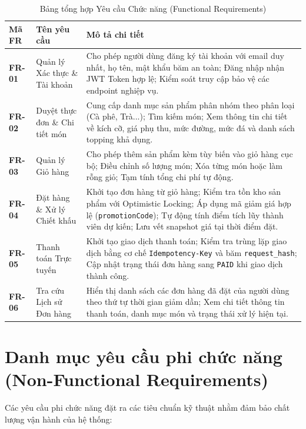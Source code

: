 \documentclass[12pt,a4paper,oneside]{report}
\begin{document}
\begin{table}[H]
\centering
\caption{Bảng tổng hợp Yêu cầu Chức năng (Functional Requirements)}
\label{tab:functional-requirements}
\begin{tabularx}{\textwidth}{lp{3.5cm}X}
\toprule
\textbf{Mã FR} & \textbf{Tên yêu cầu} & \textbf{Mô tả chi tiết} \\
\midrule
\textbf{FR-01} & Quản lý Xác thực \& Tài khoản & Cho phép người dùng đăng ký tài khoản với email duy nhất, họ tên, mật khẩu băm an toàn; Đăng nhập nhận JWT Token hợp lệ; Kiểm soát truy cập bảo vệ các endpoint nghiệp vụ. \\
\textbf{FR-02} & Duyệt thực đơn \& Chi tiết món & Cung cấp danh mục sản phẩm phân nhóm theo phân loại (Cà phê, Trà...); Tìm kiếm món; Xem thông tin chi tiết về kích cỡ, giá phụ thu, mức đường, mức đá và danh sách topping khả dụng. \\
\textbf{FR-03} & Quản lý Giỏ hàng & Cho phép thêm sản phẩm kèm tùy biến vào giỏ hàng cục bộ; Điều chỉnh số lượng món; Xóa từng món hoặc làm rỗng giỏ; Tạm tính tổng chi phí tự động. \\
\textbf{FR-04} & Đặt hàng \& Xử lý Chiết khấu & Khởi tạo đơn hàng từ giỏ hàng; Kiểm tra tồn kho sản phẩm với Optimistic Locking; Áp dụng mã giảm giá hợp lệ (\texttt{promotionCode}); Tự động tính điểm tích lũy thành viên dự kiến; Lưu vết snapshot giá tại thời điểm đặt. \\
\textbf{FR-05} & Thanh toán Trực tuyến & Khởi tạo giao dịch thanh toán; Kiểm tra trùng lặp giao dịch bằng cơ chế \texttt{Idempotency-Key} và băm \texttt{request\_hash}; Cập nhật trạng thái đơn hàng sang \texttt{PAID} khi giao dịch thành công. \\
\textbf{FR-06} & Tra cứu Lịch sử Đơn hàng & Hiển thị danh sách các đơn hàng đã đặt của người dùng theo thứ tự thời gian giảm dần; Xem chi tiết thông tin thanh toán, danh mục món và trạng thái xử lý hiện tại. \\
\bottomrule
\end{tabularx}
\end{table}

\section{Danh mục yêu cầu phi chức năng (Non-Functional Requirements)}
Các yêu cầu phi chức năng đặt ra các tiêu chuẩn kỹ thuật nhằm đảm bảo chất lượng vận hành của hệ thống:
\end{document}
